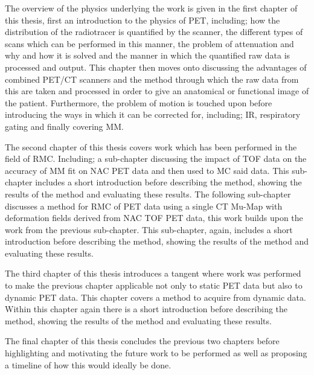         The overview of the physics underlying the work is given in the first chapter of this thesis, first an introduction to the physics of \gls{PET}, including; how the distribution of the radiotracer is quantified by the scanner, the different types of scans which can be performed in this manner, the problem of attenuation and why and how it is solved and the manner in which the quantified raw data is processed and output. This chapter then moves onto discussing the advantages of combined \gls{PET}/\gls{CT} scanners and the method through which the raw data from this are taken and processed in order to give an anatomical or functional image of the patient. Furthermore, the problem of motion is touched upon before introducing the ways in which it can be corrected for, including; \gls{IR}, respiratory gating and finally covering \gls{MM}.
        
        The second chapter of this thesis covers work which has been performed in the field of \gls{RMC}. Including; a sub-chapter discussing the impact of \gls{TOF} data on the accuracy of \gls{MM} fit on \gls{NAC} \gls{PET} data and then used to \gls{MC} said data. This sub-chapter includes a short introduction before describing the method, showing the results of the method and evaluating these results. The following sub-chapter discusses a method for \gls{RMC} of \gls{PET} data using a single \gls{CT} \gls{Mu-Map} with deformation fields derived from \gls{NAC} \gls{TOF} \gls{PET} data, this work builds upon the work from the previous sub-chapter. This sub-chapter, again, includes a short introduction before describing the method, showing the results of the method and evaluating these results.
        
        The third chapter of this thesis introduces a tangent where work was performed to make the previous chapter applicable not only to static \gls{PET} data but also to dynamic \gls{PET} data. This chapter covers a method to acquire  from dynamic data.%
        Within this chapter again there is a short introduction before describing the method, showing the results of the method and evaluating these results.
        
        The final chapter of this thesis concludes the previous two chapters before highlighting and motivating the future work to be performed as well as proposing a timeline of how this would ideally be done.
